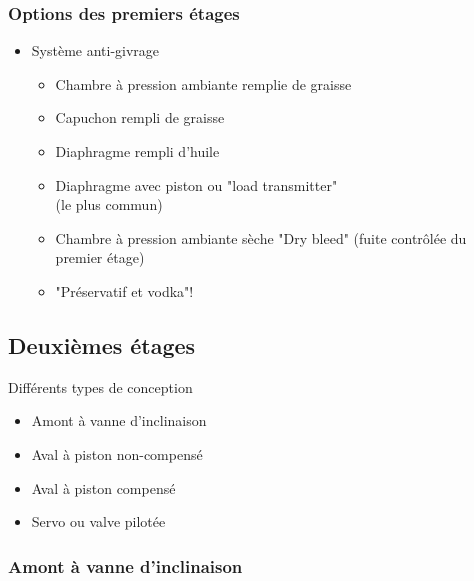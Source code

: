\documentclass[aspectratio=1610,english,12pt]{beamer}
\begin{document}
\subsubsection{Options des premiers étages}
\begin{frame}{\insertsubsubsection}
	\begin{itemize}
		\item Système anti-givrage
		\begin{itemize}
			\item Chambre à pression ambiante remplie de graisse
			\item Capuchon rempli de graisse
			\item Diaphragme rempli d'huile
			\item Diaphragme avec piston ou "load transmitter" \\ (le plus commun)
			\item Chambre à pression ambiante sèche "Dry bleed" (fuite contrôlée du premier étage)
			\item "Préservatif et vodka"!
		\end{itemize}
	\end{itemize}
\end{frame}

\subsection{Deuxièmes étages}

\begin{frame}{Différents types de conception }
	\begin{itemize}
		\item Amont à vanne d'inclinaison
		\item Aval à piston non-compensé
		\item Aval à piston compensé
		\item Servo ou valve pilotée
	\end{itemize}
\end{frame}

\subsubsection{Amont à vanne d'inclinaison}
\begin{frame}{\insertsubsubsection}
\end{frame}
\end{document}
